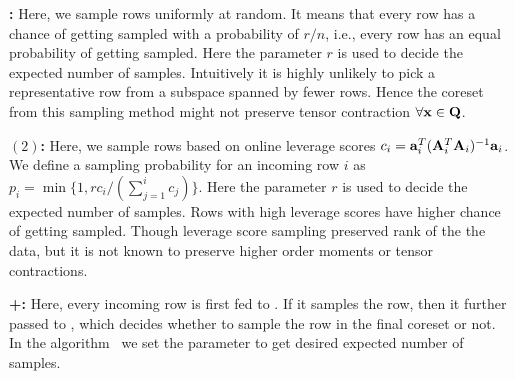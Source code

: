 \textbf{\uni:} Here, we sample rows uniformly at random. It means that every row has a chance of getting sampled with a probability of $r/n$, i.e., every row has an equal probability of getting sampled. Here the parameter $r$ is used to decide the expected number of samples. Intuitively it is highly unlikely to pick a representative row from a subspace spanned by fewer rows. Hence the coreset from this sampling method might not preserve tensor contraction $\forall \mathbf{x} \in \mathbf{Q}$.

\textbf{\online$(2)$:} Here, we sample rows based on online leverage scores $c_{i} = \mathbf{a}_{i}^{T}(\mathbf{A}_{i}^{T}\mathbf{A}_{i})^{-1}\mathbf{a}_{i}$. We define a sampling probability for an incoming row $i$ as $p_{i} = \min\{1,rc_{i}/(\sum_{j=1}^{i}c_{j})\}$. Here the parameter $r$ is used to decide the expected number of samples. Rows with high leverage scores have higher chance of getting sampled. Though leverage score sampling preserved rank of the the data, but it is not known to preserve higher order moments or tensor contractions.

\textbf{\online+:} Here, every incoming row is first fed to \online. If it samples the row, then it further passed to , which decides whether to sample the row in the final coreset or not. In the algorithm ~we set the parameter to get desired expected number of samples.

